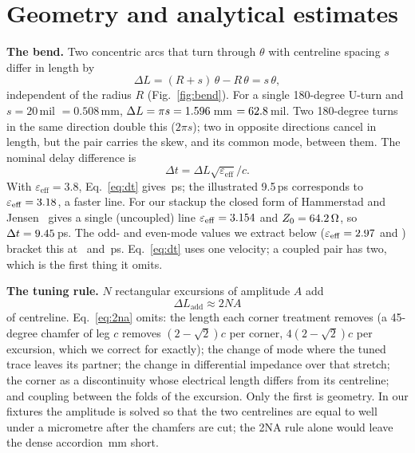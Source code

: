 \documentclass[10pt,twocolumn]{article}
\newcommand{\eeff}{\varepsilon_{\mathrm{eff}}}
\begin{document}
\section{Geometry and analytical estimates}
\label{sec:geometry}

\textbf{The bend.} Two concentric arcs that turn through $\theta$ with centreline spacing $s$ differ in length by
\begin{equation}
  \Delta L = (R + s)\,\theta - R\,\theta = s\,\theta ,
  \label{eq:dl}
\end{equation}
independent of the radius $R$ (Fig.~\ref{fig:bend}). For a single 180-degree U-turn and $s = 20$\,mil
$= 0.508$\,mm, $\Delta L = \pi s = 1.596$\,mm $= 62.8$\,mil. Two 180-degree turns in the same direction
double this ($2\pi s$); two in opposite directions cancel in length, but the pair carries the skew, and its common
mode, between them. The nominal delay difference is
\begin{equation}
  \Delta t = \Delta L \sqrt{\eeff}/c .
  \label{eq:dt}
\end{equation}
With $\eeff = 3.8$, Eq.~\eqref{eq:dt} gives \SkewEpsThreeEight\,ps; the illustrated 9.5\,ps corresponds to
$\eeff = \EpsNineFive$, a faster line. For our stackup the closed form of Hammerstad and
Jensen~\cite{hammerstad1980} gives a single (uncoupled) line $\eeff = \EpsSingle$ and $Z_0 = 64.2\,\Omega$, so
$\Delta t = 9.45$\,ps. The odd- and even-mode values we extract below
($\eeff = \EpsOdd$ and \EpsEven) bracket this at \SkewOdd\ and \SkewEven\,ps. Eq.~\eqref{eq:dt} uses one
velocity; a coupled pair has two, which is the first thing it omits.

\textbf{The tuning rule.} $N$ rectangular excursions of amplitude $A$ add
\begin{equation}
  \Delta L_\mathrm{add} \approx 2NA
  \label{eq:2na}
\end{equation}
of centreline. Eq.~\eqref{eq:2na} omits: the length each corner treatment removes (a 45-degree chamfer of leg $c$
removes $(2-\sqrt{2})c$ per corner, $4(2-\sqrt{2})c$ per excursion, which we correct for exactly); the change of
mode where the tuned trace leaves its partner; the change in differential impedance over that stretch; the corner
as a discontinuity whose electrical length differs from its centreline; and coupling between the folds of the
excursion. Only the first is geometry. In our fixtures the amplitude is solved so that the two centrelines are
equal to well under a micrometre after the chamfers are cut; the 2NA rule alone would leave the dense accordion
\ShortfallD\,mm short.
\end{document}
